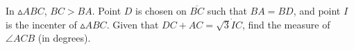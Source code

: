 In $\vartriangle ABC$, $BC > BA$. Point $D$ is chosen on $\overline{BC}$ such that $BA = BD$, and point $I$ is the incenter of $\vartriangle ABC$. Given that $DC + AC =\sqrt 3 \dot IC$, find the measure of  $\angle ACB$ (in degrees).
